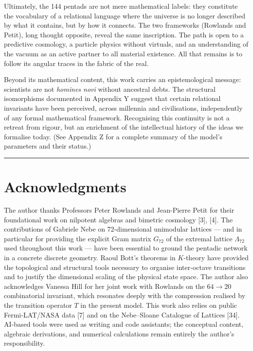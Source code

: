 \documentclass[11pt]{article}
\begin{document}
Ultimately, the 144 pentads are not mere mathematical labels: they
constitute the vocabulary of a relational language where the universe is
no longer described by what it contains, but by how it connects. The two
frameworks (Rowlands and Petit), long thought opposite, reveal the same
inscription. The path is open to a predictive cosmology, a particle
physics without virtuals, and an understanding of the vacuum as an
active partner to all material existence. All that remains is to follow
its angular traces in the fabric of the real.

Beyond its mathematical content, this work carries an epistemological
message: scientists are not \emph{homines novi} without ancestral debts.
The structural isomorphisms documented in Appendix Y suggest that
certain relational invariants have been perceived, across millennia and
civilisations, independently of any formal mathematical framework.
Recognising this continuity is not a retreat from rigour, but an
enrichment of the intellectual history of the ideas we formalise today.
(See Appendix Z for a complete summary of the model's parameters and
their status.)

\begin{center}\rule{0.5\linewidth}{0.5pt}\end{center}

\hypertarget{acknowledgments}{%
\section{Acknowledgments}\label{acknowledgments}}

The author thanks Professors Peter Rowlands and Jean-Pierre Petit for
their foundational work on nilpotent algebras and bimetric cosmology
{[}3{]}, {[}4{]}. The contributions of Gabriele Nebe on 72-dimensional
unimodular lattices --- and in particular for providing the explicit
Gram matrix \(G_{72}\) of the extremal lattice \(\Lambda_{72}\) used
throughout this work --- have been essential to ground the pentadic
network in a concrete discrete geometry. Raoul Bott's theorems in
\(K\)-theory have provided the topological and structural tools
necessary to organise inter‑octave transitions and to justify the
dimensional scaling of the physical state space. The author also
acknowledges Vanessa Hill for her joint work with Rowlands on the
\(64 \to 20\) combinatorial invariant, which resonates deeply with the
compression realised by the transition operator \(T\) in the present
model. This work also relies on public Fermi‑LAT/NASA data {[}7{]} and
on the Nebe--Sloane Catalogue of Lattices {[}34{]}. AI‑based tools were
used as writing and code assistants; the conceptual content, algebraic
derivations, and numerical calculations remain entirely the author's
responsibility.
\end{document}
